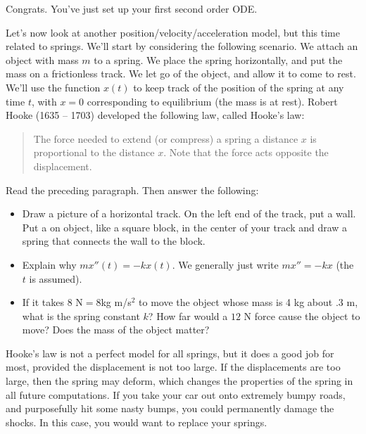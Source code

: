 Congrats.  You've just set up your first second order ODE. 

Let's now look at another position/velocity/acceleration model, but this time related to springs. 
We'll start by considering the following scenario. We attach an object with mass $m$ to a spring.  
We place the spring horizontally, and put the mass on a frictionless track. We let go of the object, and allow it to come to rest. We'll use the function $x(t)$ to keep track of the position of the spring at any time $t$, with $x=0$ corresponding to equilibrium (the mass is at rest). Robert Hooke (1635 -- 1703) developed the following law, called Hooke's law:
\begin{quote}
 The force needed to extend (or compress) a spring a distance $x$ is proportional to the distance $x$. Note that the force acts opposite the displacement.
\end{quote}
\begin{problem}
 Read the preceding paragraph.  Then answer the following:
\begin{itemize}
 \item Draw a picture of a horizontal track. On the left end of the track, put a wall. Put a on object, like a square block, in the center of your track and draw a spring that connects the wall to the block.
 \item Explain why $mx''(t)=-kx(t)$. We generally just write $mx''=-kx$ (the $t$ is assumed).  
 \item If it takes $8 \text{ N} = 8$kg m/s$^2$ to move the object whose mass is 4 kg about $.3$ m, what is the spring constant $k$?  How far would a $12$ N force cause the object to move? Does the mass of the object matter?
\end{itemize}
\end{problem}

Hooke's law is not a perfect model for all springs, but it does a good job for most, provided the displacement is not too large.  If the displacements are too large, then the spring may deform, which changes the properties of the spring in all future computations.  If you take your car out onto extremely bumpy roads, and purposefully hit some nasty bumps, you could permanently damage the shocks. In this case, you would want to replace your springs.

